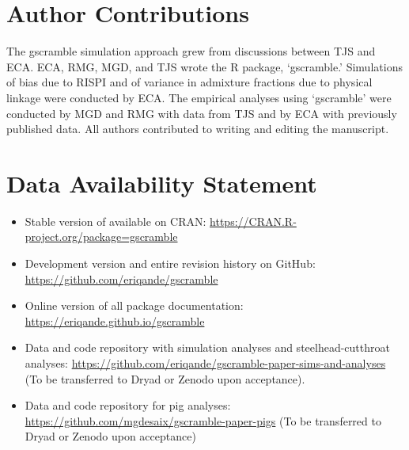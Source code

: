 \section*{Author Contributions}

The gscramble simulation approach grew from discussions between TJS and ECA\@.
ECA, RMG, MGD, and TJS wrote the R package, `gscramble.'   Simulations of bias due to RISPI and
of variance in admixture fractions due to physical linkage were conducted by ECA.
The empirical analyses using `gscramble' were conducted
by MGD and RMG with data from TJS and by ECA with previously published data.  All authors contributed to writing and
editing the manuscript.

\section*{Data Availability Statement}

\begin{itemize}
\item Stable version of \gscramble{} available on CRAN: \url{https://CRAN.R-project.org/package=gscramble}
\item Development version and entire revision history on GitHub: \url{https://github.com/eriqande/gscramble}
\item Online version of all package documentation: \url{https://eriqande.github.io/gscramble}
\item Data and code repository with simulation analyses and steelhead-cutthroat analyses: \url{https://github.com/eriqande/gscramble-paper-sims-and-analyses} (To be transferred to Dryad or Zenodo upon acceptance).
\item Data and code repository for pig analyses: \url{https://github.com/mgdesaix/gscramble-paper-pigs} (To be transferred to Dryad or Zenodo upon acceptance)
\end{itemize}
\mbox{}

